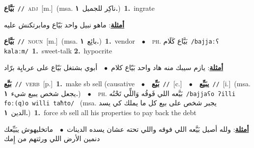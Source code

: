 \documentclass[10pt,a4paper,twoside]{article} %
\begin{document}
\begin{multicols}{2}
{\setlength\topsep{0pt}\textbf{\foreignlanguage{arabic}{بَيَّاع}}\ {\color{gray}\texttt{//}\color{black}}\ \textsc{adj}\ [m.]\ \color{gray}(msa. \foreignlanguage{arabic}{ناكِر للجميل}~\foreignlanguage{arabic}{\textbf{١.}})\color{black}\ \textbf{1.}~ingrate\  \begin{flushright}\color{gray}\foreignlanguage{arabic}{\textbf{\underline{\foreignlanguage{arabic}{أمثلة}}}: ماهو نبيل واحد بَيّاع ومابرتكنش عليه}\end{flushright}\color{black}} \vspace{2mm}

{\setlength\topsep{0pt}\textbf{\foreignlanguage{arabic}{بَيَّاع}}\ {\color{gray}\texttt{//}\color{black}}\ \textsc{noun}\ [m.]\ \color{gray}(msa. \foreignlanguage{arabic}{بائِع}~\foreignlanguage{arabic}{\textbf{١.}})\color{black}\ \textbf{1.}~vendor\ \ $\bullet$\ \ \textsc{ph.} \color{gray} \foreignlanguage{arabic}{بَيَّاع كَلَام}\color{black}\ {\color{gray}\texttt{/{\sffamily bajjaːʕ kalaːm}/}\color{black}}\ \textbf{1.}~sweet-talk  \textbf{2.}~hypocrite\  \begin{flushright}\color{gray}\foreignlanguage{arabic}{\textbf{\underline{\foreignlanguage{arabic}{أمثلة}}}: يازم سيبك منه هاد واحد بَيّاع كلام\ $\bullet$\ \  أبوي بشتغل بَيّاع على عربايِة برّاد}\end{flushright}\color{black}} \vspace{2mm}

{\setlength\topsep{0pt}\textbf{\foreignlanguage{arabic}{بَيَّع}}\ {\color{gray}\texttt{//}\color{black}}\ \textsc{verb}\ [p.]\ \textbf{1.}~make sb sell (causative\ \ $\bullet$\ \ \setlength\topsep{0pt}\textbf{\foreignlanguage{arabic}{بَيِّع}}\ {\color{gray}\texttt{//}\color{black}}\ [c.]\ \ $\bullet$\ \ \setlength\topsep{0pt}\textbf{\foreignlanguage{arabic}{يبَيِّع}}\ {\color{gray}\texttt{//}\color{black}}\ [i.]\ \color{gray}(msa. \foreignlanguage{arabic}{يجعل شخص يبيع شيء}~\foreignlanguage{arabic}{\textbf{١.}})\color{black}\ \ $\bullet$\ \ \textsc{ph.} \color{gray} \foreignlanguage{arabic}{بَيَّعه اللي فَوقُه وَاللِّي تَحْتُه}\color{black}\ {\color{gray}\texttt{/{\sffamily bajjaʕo ʔilli foː(q)o willi taħto}/}\color{black}}\ \color{gray} (msa. \foreignlanguage{arabic}{يجبر شخص على بيع كل ما يملك كي يسد الدين}~\foreignlanguage{arabic}{\textbf{١.}})\color{black}\ \textbf{1.}~force sb sell all his properties to pay back the debt\  \begin{flushright}\color{gray}\foreignlanguage{arabic}{\textbf{\underline{\foreignlanguage{arabic}{أمثلة}}}: ولله أصيل بَيَّعه اللي فوقه واللي تحته عشان يسده الدينات\ $\bullet$\ \  ماتخليهوش يبَيِّعك دنمين الأرض اللي ورثتهم من إِمك}\end{flushright}\color{black}} \vspace{2mm}


\end{multicols}
\end{document}
